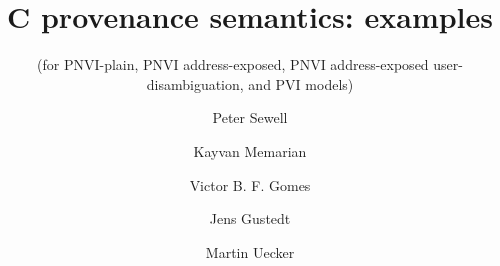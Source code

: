 \documentclass[acmsmall,review,screen]{acmart}\settopmatter{printfolios=true,printccs=false,printacmref=false}
\newif\ifWGfourteennumber
\begin{document}
\ifWGfourteennumber
\fancypagestyle{firstpagestyle}{%
\fancyhf{} %
\fancyhead[C]{ISO/IEC JTC1/SC22/WG14 Nxxxx, 2019-03-xx} %
\renewcommand{\headrulewidth}{0pt}
\renewcommand{\footrulewidth}{0pt}}
\thispagestyle{plain}
\fi

\title[C provenance semantics: examples]{C provenance semantics: examples}
\subtitle{(for PNVI-plain, PNVI address-exposed, PNVI address-exposed 
user-disambiguation, and PVI models)}


\authorsaddresses{}



\author{Peter Sewell}



 \author{Kayvan Memarian}
% 
% 

 \author{Victor B. F. Gomes}

 \author{Jens Gustedt}

 \author{Martin Uecker}

 
\renewcommand{\shortauthors}{Sewell, Memarian, Gomes, Gustedt, Uecker}
\end{document}
